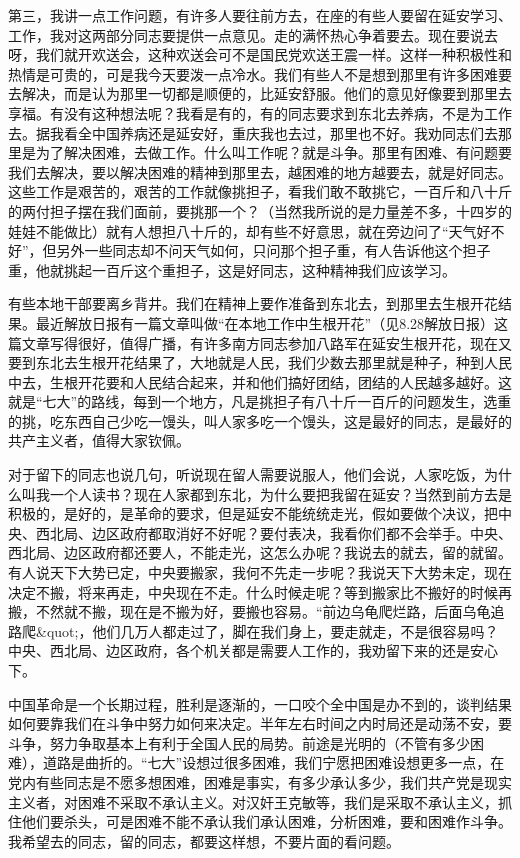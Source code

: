 第三，我讲一点工作问题，有许多人要往前方去，在座的有些人要留在延安学习、工作，我对这两部分同志要提供一点意见。走的满怀热心争着要去。现在要说去呀，我们就开欢送会，这种欢送会可不是国民党欢送王震一样。这样一种积极性和热情是可贵的，可是我今天要泼一点冷水。我们有些人不是想到那里有许多困难要去解决，而是认为那里一切都是顺便的，比延安舒服。他们的意见好像要到那里去享福。有没有这种想法呢？我看是有的，有的同志要求到东北去养病，不是为工作去。据我看全中国养病还是延安好，重庆我也去过，那里也不好。我劝同志们去那里是为了解决困难，去做工作。什么叫工作呢？就是斗争。那里有困难、有问题要我们去解决，要以解决困难的精神到那里去，越困难的地方越要去，就是好同志。这些工作是艰苦的，艰苦的工作就像挑担子，看我们敢不敢挑它，一百斤和八十斤的两付担子摆在我们面前，要挑那一个？（当然我所说的是力量差不多，十四岁的娃娃不能做比）就有人想担八十斤的，却有些不好意思，就在旁边问了“天气好不好”，但另外一些同志却不问天气如何，只问那个担子重，有人告诉他这个担子重，他就挑起一百斤这个重担子，这是好同志，这种精神我们应该学习。

有些本地干部要离乡背井。我们在精神上要作准备到东北去，到那里去生根开花结果。最近解放日报有一篇文章叫做“在本地工作中生根开花”（见8.28解放日报）这篇文章写得很好，值得广播，有许多南方同志参加八路军在延安生根开花，现在又要到东北去生根开花结果了，大地就是人民，我们少数去那里就是种子，种到人民中去，生根开花要和人民结合起来，并和他们搞好团结，团结的人民越多越好。这就是“七大”的路线，每到一个地方，凡是挑担子有八十斤一百斤的问题发生，选重的挑，吃东西自己少吃一馒头，叫人家多吃一个馒头，这是最好的同志，是最好的共产主义者，值得大家钦佩。

对于留下的同志也说几句，听说现在留人需要说服人，他们会说，人家吃饭，为什么叫我一个人读书？现在人家都到东北，为什么要把我留在延安？当然到前方去是积极的，是好的，是革命的要求，但是延安不能统统走光，假如要做个决议，把中央、西北局、边区政府都取消好不好呢？要付表决，我看你们都不会举手。中央、西北局、边区政府都还要人，不能走光，这怎么办呢？我说去的就去，留的就留。有人说天下大势已定，中央要搬家，我何不先走一步呢？我说天下大势未定，现在决定不搬，将来再走，中央现在不走。什么时候走呢？等到搬家比不搬好的时候再搬，不然就不搬，现在是不搬为好，要搬也容易。“前边乌龟爬烂路，后面乌龟追路爬&quot;，他们几万人都走过了，脚在我们身上，要走就走，不是很容易吗？中央、西北局、边区政府，各个机关都是需要人工作的，我劝留下来的还是安心下。

中国革命是一个长期过程，胜利是逐渐的，一口咬个全中国是办不到的，谈判结果如何要靠我们在斗争中努力如何来决定。半年左右时间之内时局还是动荡不安，要斗争，努力争取基本上有利于全国人民的局势。前途是光明的（不管有多少困难），道路是曲折的。“七大”设想过很多困难，我们宁愿把困难设想更多一点，在党内有些同志是不愿多想困难，困难是事实，有多少承认多少，我们共产党是现实主义者，对困难不采取不承认主义。对汉奸王克敏等，我们是采取不承认主义，抓住他们要杀头，可是困难不能不承认我们承认困难，分析困难，要和困难作斗争。我希望去的同志，留的同志，都要这样想，不要片面的看问题。

